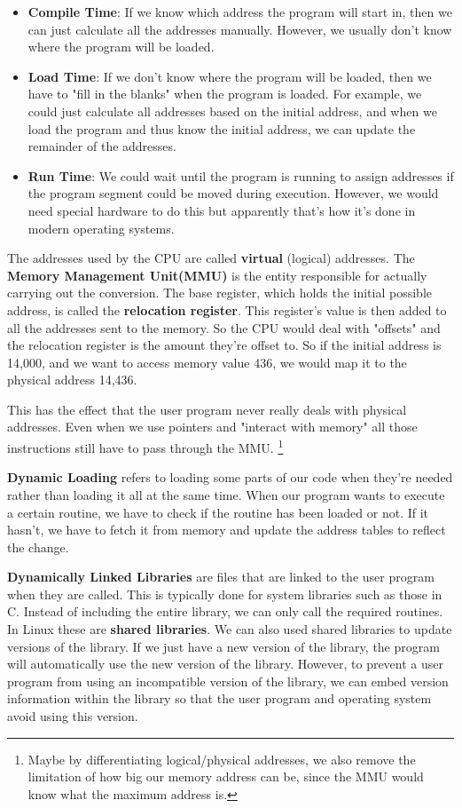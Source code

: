 \documentclass{tufte-handout}
\begin{document}
\begin{itemize}
	\item \textbf{Compile Time}: If we know which address the program will start in, 
			then we can just calculate all the addresses manually. However, we usually
			don't know where the program will be loaded.
	\item \textbf{Load Time}: If we don't know where the program will be loaded, then 
			we have to "fill in the blanks" when the program is loaded. For example, 
			we could just calculate all addresses based on the initial address, and 
			when we load the program and thus know the initial address, we can update
			the remainder of the addresses.
	\item \textbf{Run Time}: We could wait until the program is running to assign addresses
			if the program segment could be moved during execution. However, we would
			need special hardware to do this but apparently that's how it's done 
			in modern operating systems.
\end{itemize}

The addresses used by the CPU are called \textbf{virtual} (logical) addresses. The 
\textbf{Memory Management Unit(MMU)} is the entity responsible for actually carrying 
out the conversion. The base register, which holds the initial possible address, is called the \textbf{relocation register}. This register's value is then added to all the addresses sent to the memory. So the CPU would deal with "offsets" and the 
relocation register is the amount they're offset to. So if the initial address
is 14,000, and we want to access memory value 436, we would map it to the physical 
address 14,436.

This has the effect that the user  program never really deals with physical addresses. 
Even when we use pointers and "interact with memory" all those instructions still have
to pass through the MMU.
\footnote{Maybe by differentiating logical/physical addresses, we also remove the 
limitation of how big our memory address can be, since the MMU would know what the 
maximum address is.}

\textbf{Dynamic Loading} refers to loading some parts of our code when they're needed
rather than loading it all at the same time. When our program wants to execute 
a certain routine, we have to check if the routine has been loaded or not. If it hasn't,
we have to fetch it from memory and update the address tables to reflect the change.

\textbf{Dynamically Linked Libraries} are files that are linked to the user program
when they are called. This is typically done for system libraries such as those in C.
Instead of including the entire library, we can only call the required routines. In 
Linux these are \textbf{shared libraries}. We can also used shared libraries
to update versions of the library. If we just have a new version of the library, 
the program will automatically use the new version of the library. However, to 
prevent a user program from using an incompatible version of the library, we can 
embed version information within the library so that the user program and operating
system avoid using this version.
\end{document}
